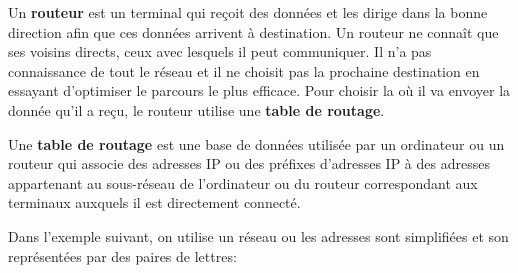 \documentclass[11pt, a4paper]{book}
\begin{document}
Un {\bf routeur} est un terminal qui reçoit des données et les dirige dans la bonne direction afin que ces données arrivent à destination. Un routeur ne connaît que ses voisins directs, ceux avec lesquels il peut communiquer. Il n'a pas connaissance de tout le réseau et il ne choisit pas la prochaine destination en essayant d'optimiser le parcours le plus efficace. Pour choisir la où il va envoyer la donnée qu'il a reçu, le routeur utilise une {\bf table de routage}.

\begin{defi}
Une {\bf table de routage} est une base de données utilisée par un ordinateur ou un routeur qui associe des adresses IP ou des préfixes d'adresses IP à des adresses appartenant au sous-réseau de l'ordinateur ou du routeur correspondant aux terminaux auxquels il est directement connecté.
\end{defi}

Dans l'exemple suivant, on utilise un réseau ou les adresses sont simplifiées et son représentées par des paires de lettres: 
\end{document}

